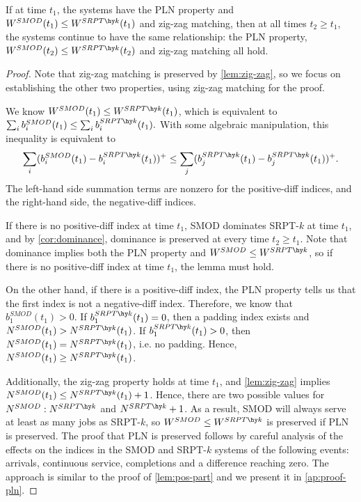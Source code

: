 \documentclass[acmsmall]{acmart}
\begin{document}
\begin{lemma}
    \label{lem:pln}
    If at time $t_1$, the systems have the PLN property and $W^{SMOD}(t_1) \le W^{SRPT\hy k}(t_1)$ and zig-zag matching,
    then at all times $t_2 \ge t_1$, the systems continue to have the same relationship:
    the PLN property, $W^{SMOD}(t_2) \le W^{SRPT\hy k}(t_2)$ and zig-zag matching all hold.
\end{lemma}
\begin{proof}
    Note that zig-zag matching is preserved by \cref{lem:zig-zag}, so we focus on establishing the other two properties, using zig-zag matching for the proof.

    We know $W^{SMOD}(t_1) \le W^{SRPT\hy k}(t_1)$, which is equivalent to
    $\sum_i b_i^{SMOD}(t_1) \leq \sum_i b_i^{SRPT\hy k}(t_1).$
    With some algebraic manipulation, this inequality is equivalent to
    \begin{align*}
        \sum_i (b_i^{SMOD}(t_1)-b_i^{SRPT\hy k}(t_1))^+ \leq \sum_j (b_j^{SRPT\hy k}(t_1)-b_j^{SRPT\hy k}(t_1))^+.
    \end{align*}
    The left-hand side summation terms are nonzero for the positive-diff indices, and the right-hand side, the negative-diff indices. 

    If there is no positive-diff index at time $t_1$, SMOD dominates SRPT-$k$ at time $t_1$, and by \cref{cor:dominance}, dominance is preserved at every time $t_2\geq t_1$. 
    Note that dominance implies both the PLN property and $W^{SMOD} \le W^{SRPT\hy k}$,
    so if there is no positive-diff index at time $t_1$, the lemma must hold.
    
    On the other hand, if there is a positive-diff index, the PLN property tells us that the first index is not a negative-diff index. Therefore, we know that $b^{SMOD}_1(t_1) > 0$. If $b^{SRPT\hy k}_1(t_1) = 0$, then a padding index exists and $N^{SMOD}(t_1) > N^{SRPT\hy k}(t_1)$. If $b^{SRPT\hy k}_1(t_1) > 0$, then $N^{SMOD}(t_1) = N^{SRPT\hy k}(t_1)$, i.e. no padding. Hence, $N^{SMOD}(t_1) \ge N^{SRPT\hy k}(t_1)$.

    Additionally, the zig-zag property holds at time $t_1$, and \cref{lem:zig-zag} implies $N^{SMOD}(t_1) \le N^{SRPT\hy k}(t_1) + 1$. Hence, there are two possible values for $N^{SMOD}: N^{SRPT\hy k}$ and $N^{SRPT\hy k} + 1$.
    As a result, SMOD will always serve at least as many jobs as SRPT-$k$, so $W^{SMOD} \le W^{SRPT\hy k}$ is preserved if PLN is preserved. The proof that PLN is preserved follows by careful analysis of the effects on the indices in the SMOD and SRPT-$k$ systems of the following events: arrivals, continuous service, completions and a difference reaching zero. The approach is similar to the proof of \cref{lem:pos-part} and we present it in \cref{ap:proof-pln}.
\end{proof}
\end{document}
